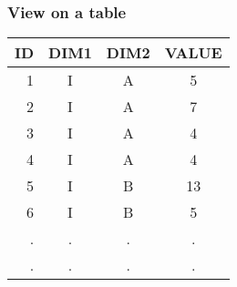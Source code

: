 \begin{frame}\frametitle{View on a table}
	\vspace{-0.2cm}
	\begin{center}
	\begin{tabular}{|r|ccc|}
	\hline
	{\bf ID} & {\bf DIM1} & {\bf DIM2} & {\bf VALUE}  \\ \hline
	1 & I & A & 5 \\ 
	2 & I & A & 7 \\ 
	3 & I & A & 4 \\	
	4 & I & A & 4 \\
	5 & I & B & 13 \\ 
	6 & I & B & 5 \\ 	
	. & . & . & . \\ 	
	. & . & . & . \\ 			
	\hline
	\end{tabular}
	\end{center}
	
	\vspace{-1cm}
	
	\begin{columns}
	\begin{column}{5cm}
	\end{column}
	\begin{column}{5cm}
		\end{column}
	\end{columns}
\end{frame}

